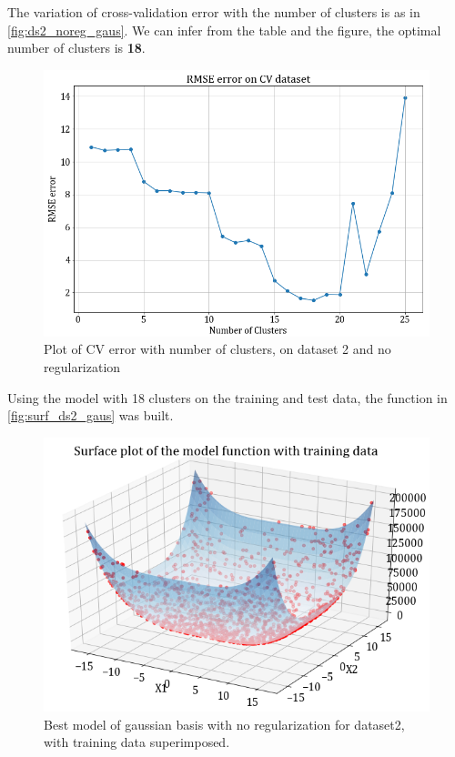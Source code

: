 \documentclass[12pt,a4paper]{article}
\newcommand{\noi}{\noindent}
\begin{document}
\noi
The variation of cross-validation error with the number of clusters is as in \autoref{fig:ds2_noreg_gaus}. We can infer from the table and the figure, the optimal number of clusters is \textbf{18}.
\begin{figure}[H]
    \centering
    \includegraphics[scale=0.5]{images/errorplot_ds2_no_reg.png}
    \caption{Plot of CV error with number of clusters, on dataset 2 and no regularization}
    \label{fig:ds2_noreg_gaus}
\end{figure}

\noi
Using the model with 18 clusters on the training and test data, the function in \autoref{fig:surf_ds2_gaus} was built. 
\begin{figure}[H]
    \centering
    \includegraphics[scale=0.4]{images/surface_gaus_ds2_noreg.png}
    \caption{Best model of gaussian basis with no regularization for dataset2, with training data superimposed.}
    \label{fig:surf_ds2_gaus}
\end{figure}
\end{document}
